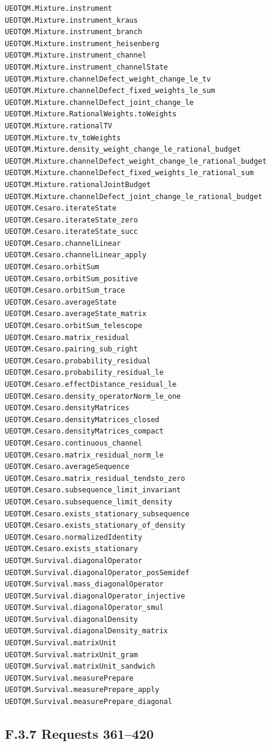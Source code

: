\documentclass[
  11pt,
  oneside]{book}
\begin{document}
\begin{Verbatim}[breaklines,breakanywhere,fontsize=\scriptsize]
UEOTQM.Mixture.instrument
UEOTQM.Mixture.instrument_kraus
UEOTQM.Mixture.instrument_branch
UEOTQM.Mixture.instrument_heisenberg
UEOTQM.Mixture.instrument_channel
UEOTQM.Mixture.instrument_channelState
UEOTQM.Mixture.channelDefect_weight_change_le_tv
UEOTQM.Mixture.channelDefect_fixed_weights_le_sum
UEOTQM.Mixture.channelDefect_joint_change_le
UEOTQM.Mixture.RationalWeights.toWeights
UEOTQM.Mixture.rationalTV
UEOTQM.Mixture.tv_toWeights
UEOTQM.Mixture.density_weight_change_le_rational_budget
UEOTQM.Mixture.channelDefect_weight_change_le_rational_budget
UEOTQM.Mixture.channelDefect_fixed_weights_le_rational_sum
UEOTQM.Mixture.rationalJointBudget
UEOTQM.Mixture.channelDefect_joint_change_le_rational_budget
UEOTQM.Cesaro.iterateState
UEOTQM.Cesaro.iterateState_zero
UEOTQM.Cesaro.iterateState_succ
UEOTQM.Cesaro.channelLinear
UEOTQM.Cesaro.channelLinear_apply
UEOTQM.Cesaro.orbitSum
UEOTQM.Cesaro.orbitSum_positive
UEOTQM.Cesaro.orbitSum_trace
UEOTQM.Cesaro.averageState
UEOTQM.Cesaro.averageState_matrix
UEOTQM.Cesaro.orbitSum_telescope
UEOTQM.Cesaro.matrix_residual
UEOTQM.Cesaro.pairing_sub_right
UEOTQM.Cesaro.probability_residual
UEOTQM.Cesaro.probability_residual_le
UEOTQM.Cesaro.effectDistance_residual_le
UEOTQM.Cesaro.density_operatorNorm_le_one
UEOTQM.Cesaro.densityMatrices
UEOTQM.Cesaro.densityMatrices_closed
UEOTQM.Cesaro.densityMatrices_compact
UEOTQM.Cesaro.continuous_channel
UEOTQM.Cesaro.matrix_residual_norm_le
UEOTQM.Cesaro.averageSequence
UEOTQM.Cesaro.matrix_residual_tendsto_zero
UEOTQM.Cesaro.subsequence_limit_invariant
UEOTQM.Cesaro.subsequence_limit_density
UEOTQM.Cesaro.exists_stationary_subsequence
UEOTQM.Cesaro.exists_stationary_of_density
UEOTQM.Cesaro.normalizedIdentity
UEOTQM.Cesaro.exists_stationary
UEOTQM.Survival.diagonalOperator
UEOTQM.Survival.diagonalOperator_posSemidef
UEOTQM.Survival.mass_diagonalOperator
UEOTQM.Survival.diagonalOperator_injective
UEOTQM.Survival.diagonalOperator_smul
UEOTQM.Survival.diagonalDensity
UEOTQM.Survival.diagonalDensity_matrix
UEOTQM.Survival.matrixUnit
UEOTQM.Survival.matrixUnit_gram
UEOTQM.Survival.matrixUnit_sandwich
UEOTQM.Survival.measurePrepare
UEOTQM.Survival.measurePrepare_apply
UEOTQM.Survival.measurePrepare_diagonal
\end{Verbatim}

\subsection{F.3.7 Requests 361--420}
\end{document}
